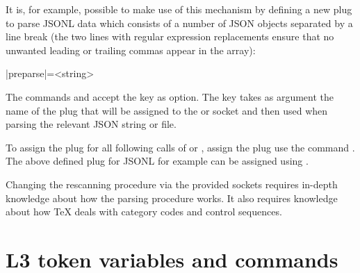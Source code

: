 \documentclass[a4paper]{article}
\begin{document}
{{


It is, for example, possible to make use of this mechanism by defining a new plug to parse JSONL data which consists of a number of JSON objects separated by a line break (the two lines with regular expression replacements ensure that no unwanted leading or trailing commas appear in the array):


\begin{macrodef}
|preparse|={<string>}
\end{macrodef}
The commands \macro{\JSONParse} and \macro{\JSONParseFromFile} accept the key  as option. The key takes as argument the name of the plug that will be assigned to the  or  socket and then used when parsing the relevant JSON string or file.

To assign the plug for all following calls of \macro{\JSONParse} or \macro{\JSONParseFromFile}, assign the plug use the command \macro{\AssignSocketPlug}. The above defined plug for JSONL for example can be assigned using .

\warning Changing the rescanning procedure via the provided sockets requires in-depth knowledge about how the parsing procedure works. It also requires knowledge about how TeX deals with category codes and control sequences.

\section{L3 token variables and commands}

}}
\end{document}
